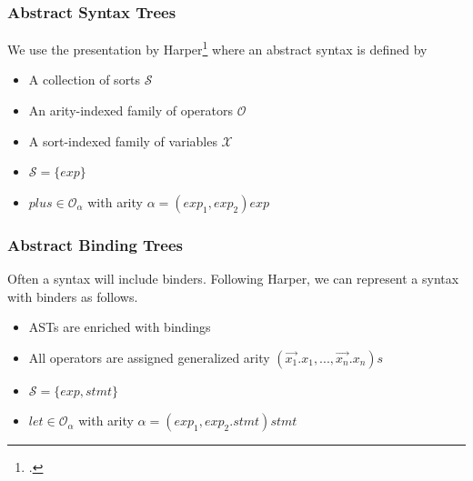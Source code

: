 \documentclass[t,24pt,serif,aspectratio=169]{beamer}
\begin{document}
\begin{frame}
  \frametitle{Abstract Syntax Trees}

  We use the presentation by Harper\footcite{harper} where an abstract
  syntax is defined by
  
    \begin{multicols}{2}
        \begin{itemize}
            \item A collection of sorts $\mathcal{S}$
            \item An arity-indexed family of operators $\mathcal{O}$
            \item A sort-indexed family of variables $\mathcal{X}$
        \end{itemize}

        \columnbreak
        \pause
        \begin{itemize}
            \item $\mathcal{S} = \{ exp \}$
            \item $plus \in \mathcal{O}_\alpha$ with arity $\alpha = (exp_1,exp_2)exp$
        \end{itemize}

    \end{multicols}

\end{frame}

\begin{frame}
  \frametitle{Abstract Binding Trees}

  Often a syntax will include binders. Following Harper, we can
  represent a syntax with binders as follows.
  
    \begin{multicols}{2}
        \begin{itemize}
            \item ASTs are enriched with bindings
            \item All operators are assigned generalized arity $(\vec{x_1}.x_1,...,\vec{x_n}.x_n)s$
        \end{itemize}
        \columnbreak
        \pause
        \begin{itemize}
            \item $\mathcal{S} = \{ exp, stmt \}$
            \item $let \in \mathcal{O}_\alpha$ with arity $\alpha = (exp_1,exp_2.stmt)stmt$
        \end{itemize}
    \end{multicols}

\end{frame}
\end{document}
